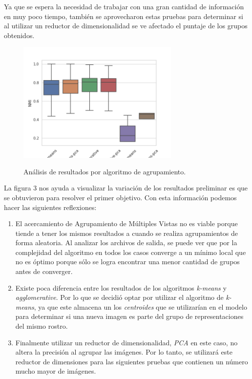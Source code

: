 \documentclass[letterpaper, 10 pt, conference]{ieeeconf}  %
\begin{document}
    Ya que se espera la necesidad de trabajar con una gran cantidad de información en muy poco
    tiempo, también se aprovecharon estas pruebas para determinar si al utilizar un reductor de
    dimensionalidad se ve afectado el puntaje de los grupos obtenidos.

    \begin{figure}[ht]
        \centering
        \includegraphics[width=8cm]{./figs/cluster_comparison.png}
        \label{fig: Results Cluster}
        \caption{Análisis de resultados por algoritmo de agrupamiento.}
    \end{figure}

    La figura 3 nos ayuda a visualizar la variación de los resultados preliminar
    es que se obtuvieron para resolver el primer objetivo. Con esta información podemos hacer
    las siguientes reflexiones:

    \begin{enumerate}
        \item El acercamiento de Agrupamiento de Múltiples Vistas no es viable porque tiende a
            tener los mismos resultados a cuando se realiza agrupamientos de forma aleatoria.
            Al analizar los archivos de salida, se puede ver que por la complejidad del algoritmo
            en todos los casos converge a un mínimo local que no es óptimo porque sólo se logra
            encontrar una menor cantidad de grupos antes de converger.
        \item Existe poca diferencia entre los resultados de los algoritmos \textit{k-means} y
            \textit{agglomerative}. Por lo que se decidió optar por utilizar el algoritmo de
            \textit{k-means}, ya que este almacena un los \textit{centroides} que se utilizarían
            en el modelo para determinar si una nueva imagen es parte del grupo de representaciones
            del mismo rostro.
        \item Finalmente utilizar un reductor de dimensionalidad, \textit{PCA} en este caso, no
            altera la precisión al agrupar las imágenes. Por lo tanto, se utilizará este reductor
            de dimensiones para las siguientes pruebas que contienen un número mucho mayor de
            imágenes.
    \end{enumerate}
\end{document}
